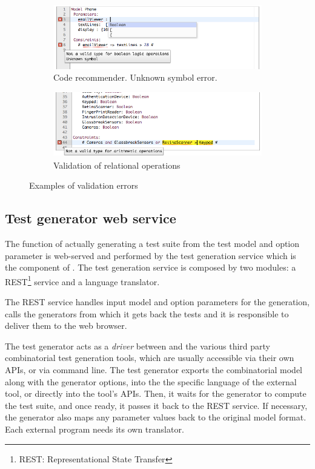 \begin{tikzborder}{\cite{Gargantini16:validation}}
\begin{tikzborder}{\cite{gargantini_combinatorial_2017}}
\begin{tikzborder}{\cite{garn2019}}
\begin{tikzborder}{\cite{arcaini2019achieving}}
\begin{figure}[bt!]
	\begin{subfigure}{\columnwidth}
		\includegraphics[width=.8\columnwidth]{images/validation2.png}\caption{Code recommender. Unknown symbol error.}
	\end{subfigure}
	
	\begin{subfigure}{\columnwidth}
		\includegraphics[width=.65\columnwidth]{images/validation3.png}\caption{Validation of relational operations}
	\end{subfigure}
	\caption{Examples of \ctwedge validation errors}\label{fig:validation}
\end{figure}


\subsection{Test generator web service}

\begin{tikzborder}{}
The function of actually generating a test suite from the test model and option parameter is web-served and performed by the test generation service which is the component of \ctwedge.
The test generation service is composed by two modules: a REST\footnote{REST: Representational State Transfer} service and a language translator.

The REST service handles input model and option parameters for the generation, calls the generators from which it gets back the tests and it is responsible to deliver them to the web browser. 

The test generator acts as a \textit{driver} between \ctwedge and the various third party combinatorial test generation tools, which are usually accessible via their own APIs, or via command line. The test generator exports the combinatorial model along with the generator options, into the the specific language of the external tool, or directly into the tool's APIs. Then, it waits for the generator to compute the test suite, and once ready, it passes it back to the REST service. If necessary, the generator also maps any parameter values back to the original \ctwedge model format. Each external program needs its own translator.
\end{tikzborder}


\end{tikzborder}
\end{tikzborder}
\end{tikzborder}
\end{tikzborder}
